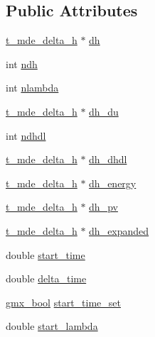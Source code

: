 \subsection*{\-Public \-Attributes}
\begin{DoxyCompactItemize}
\item 
\hyperlink{structt__mde__delta__h}{t\-\_\-mde\-\_\-delta\-\_\-h} $\ast$ \hyperlink{structt__mde__delta__h__coll_ac77a814d5dd58c76ee0fa467325274e3}{dh}
\item 
int \hyperlink{structt__mde__delta__h__coll_a7608d0c1bd5ffe23e5bde94ec6585041}{ndh}
\item 
int \hyperlink{structt__mde__delta__h__coll_aa4f99fa30979b14a49ad5f3a5a42aff0}{nlambda}
\item 
\hyperlink{structt__mde__delta__h}{t\-\_\-mde\-\_\-delta\-\_\-h} $\ast$ \hyperlink{structt__mde__delta__h__coll_a94164400cf4f40e6e7eecf0b161509a0}{dh\-\_\-du}
\item 
int \hyperlink{structt__mde__delta__h__coll_ab70374679912c6d802ca4fcb7ebbde48}{ndhdl}
\item 
\hyperlink{structt__mde__delta__h}{t\-\_\-mde\-\_\-delta\-\_\-h} $\ast$ \hyperlink{structt__mde__delta__h__coll_a5a678652bfe824fd771237f334280b79}{dh\-\_\-dhdl}
\item 
\hyperlink{structt__mde__delta__h}{t\-\_\-mde\-\_\-delta\-\_\-h} $\ast$ \hyperlink{structt__mde__delta__h__coll_a3b8d50201df3a53a8cbae363e539741e}{dh\-\_\-energy}
\item 
\hyperlink{structt__mde__delta__h}{t\-\_\-mde\-\_\-delta\-\_\-h} $\ast$ \hyperlink{structt__mde__delta__h__coll_ab405c03508eff2b9552be544cfaef76a}{dh\-\_\-pv}
\item 
\hyperlink{structt__mde__delta__h}{t\-\_\-mde\-\_\-delta\-\_\-h} $\ast$ \hyperlink{structt__mde__delta__h__coll_a506d85a579ef56d1a595585cbef490a4}{dh\-\_\-expanded}
\item 
double \hyperlink{structt__mde__delta__h__coll_adcb6f1377f6cabe6e54942db066eed2f}{start\-\_\-time}
\item 
double \hyperlink{structt__mde__delta__h__coll_a903648caa2a03174b79cc2150d28a45b}{delta\-\_\-time}
\item 
\hyperlink{include_2types_2simple_8h_a8fddad319f226e856400d190198d5151}{gmx\-\_\-bool} \hyperlink{structt__mde__delta__h__coll_a42af1b1098599c7de418898cf13ea3cf}{start\-\_\-time\-\_\-set}
\item 
double \hyperlink{structt__mde__delta__h__coll_a561f00262b00adc37b47e658d3ff8fd3}{start\-\_\-lambda}
\item 

\end{DoxyCompactItemize}
